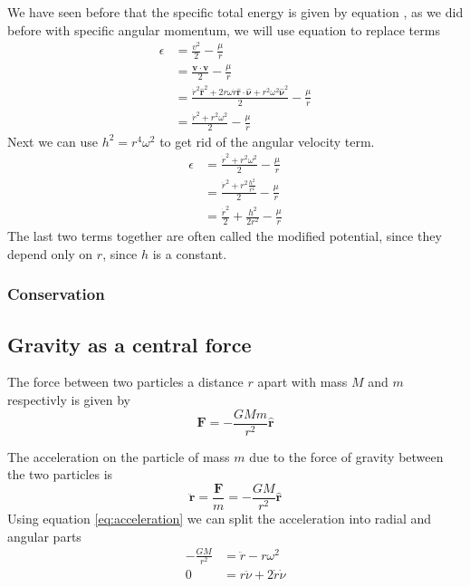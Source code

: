 We have seen before that the specific total energy is given by equation , as we did before with specific angular momentum,
we will use equation  to replace terms
\begin{align}
\epsilon &= \frac{v^2}{2} - \frac{\mu}{r} \nonumber \\
&=\frac{\mathbf{v}\cdot\mathbf{v}}{2}- \frac{\mu}{r} \nonumber \\
&=\frac{\dot{r}^2 \hat{\mathbf{r}}^2 +2r\omega\dot{r} \hat{\mathbf{r}} \cdot \hat{\mathbf{\nu}}+ r^2 \omega^2 \hat{\mathbf{\nu}}^2}{2}- \frac{\mu}{r} \nonumber \\
&=\frac{\dot{r}^2 + r^2 \omega^2}{2}- \frac{\mu}{r}
\end{align}
Next we can use $h^2 = r^4 \omega^2$ to get rid of the angular velocity term.
\begin{align}
\epsilon &=\frac{\dot{r}^2 + r^2 \omega^2}{2}- \frac{\mu}{r} \nonumber \\
&=\frac{\dot{r}^2 + r^2 \frac{h^2}{r^4}}{2}- \frac{\mu}{r} \nonumber \\
&=\frac{\dot{r}^2}{2} + \frac{h^2}{2r^2}- \frac{\mu}{r}
\end{align}
The last two terms together are often called the modified potential, since they depend only on $r$, since $h$ is a constant.
\subsubsection{Conservation}


\subsection{Gravity as a central force}
The force between two particles a distance $r$ apart with mass $M$ and $m$ respectivly is given by
\begin{equation}
\mathbf{F}=-\frac{G M m}{r^2} \hat{\mathbf{r}}
\end{equation}

The acceleration on the particle of mass $m$ due to the force of gravity between the two particles is
\begin{equation}
\ddot{\mathbf{r}} =\frac{ \mathbf{F} }{m}=-\frac{GM}{r^2} \hat{\mathbf{r}}
\end{equation}
Using equation \ref{eq:acceleration} we can split the acceleration into radial and angular parts
\begin{align}
-\frac{GM}{r^2} &=\ddot{r} - r \omega^2 \label{eq:radialAcceleration} \\
0 &=r \ddot{\nu} + 2 \dot{r} \dot{\nu} \label{eq:angularAcceleration}
\end{align}

